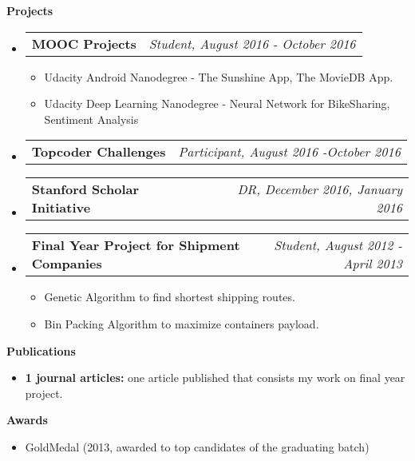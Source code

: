 \documentclass[letterpaper,11pt]{article}
\makeatletter
\newcommand{\resheading}[1]{{\large \colorbox{mygrey}{\begin{minipage}{\textwidth}{\textbf{#1 \vphantom{p\^{E}}}}\end{minipage}}}}
\newcommand{\ressubheading}[4]{
\begin{tabular*}{7.0in}{l@{\extracolsep{\fill}}r}
		\textbf{#1} & \textit{#4} \\
\end{tabular*}\vspace{-6pt}}
\makeatother
\begin{document}
\resheading{Projects}
\begin{itemize}
\item
	\ressubheading{MOOC Projects}{Online}{Crowdsourcing}{Student, August 2016 - October 2016}
	\begin{itemize}
	\item Udacity Android Nanodegree - The Sunshine App, The MovieDB App.
	\item Udacity Deep Learning Nanodegree - Neural Network for BikeSharing, Sentiment Analysis
	\end{itemize}
\item
	\ressubheading{Topcoder Challenges}{Online}{Crowdsourcing}{Participant, August 2016 -October 2016}
\item
	\ressubheading{Stanford Scholar Initiative}{Online}{Crowdsourcing}{DR, December 2016, January 2016}	
\item
	\ressubheading{Final Year Project for Shipment Companies}{APIIT,IN}{Student}{Student, August 2012 - April 2013}
	\begin{itemize}
	\item Genetic Algorithm to find shortest shipping routes.
	\item Bin Packing Algorithm to maximize containers payload.
	\end{itemize}
\end{itemize}



\resheading{Publications}
\begin{itemize}
	\item {\bf 1 journal articles:} one article published that consists my work on final year project.
\end{itemize}

\resheading{Awards}
\begin{itemize}
	\item GoldMedal (2013, awarded to top candidates of the graduating batch)
\end{itemize}
\end{document}
